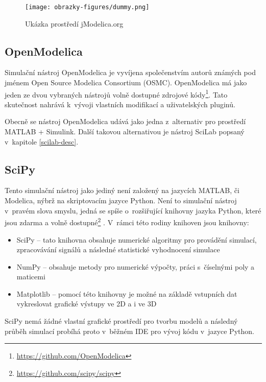 \begin{figure}
    \centering
    \texttt{[image: obrazky-figures/dummy.png]}
    \caption{Ukázka prostředí jModelica.org}
    \label{fig:jmodelica}
\end{figure}


\subsection{OpenModelica}
\label{openmodelica-desc}
Simulační nástroj OpenModelica je vyvíjena společenstvím autorů známých pod jménem Open Source Modelica Consortium (OSMC). OpenModelica má jako jeden ze dvou vybraných nástrojů volně dostupné zdrojové kódy\footnote{\url{https://github.com/OpenModelica}}. Tato skutečnost nahrává k~vývoji vlastních modifikací a uživatelských pluginů.

Obecně se nástroj OpenModelica udává jako jedna z~alternativ pro prostředí MATLAB + Simulink. Další takovou alternativou je nástroj SciLab popsaný v~kapitole \ref{scilab-desc}.


\subsection{SciPy}
\label{chapter-scipy}
Tento simulační nástroj jako jediný není založený na jazycích MATLAB, či Modelica, nýbrž na skriptovacím jazyce Python. Není to simulační nástroj v~pravém slova smyslu, jedná se spíše o~rozšiřující knihovny jazyka Python, které jsou zdarma a volně dostupné\footnote{\url{https://github.com/scipy/scipy}} \cite{scipy}. V~rámci této rodiny knihoven jsou knihovny:
\begin{itemize}
    \item SciPy -- tato knihovna obsahuje numerické algoritmy pro provádění simulací, zpracovávání signálů a následné statistické vyhodnocení simulace
    \item NumPy -- obsahuje metody pro numerické výpočty, práci s~číselnými poly a maticemi
    \item Matplotlib -- pomocí této knihovny je možné na základě vstupních dat vykreslovat grafické výstupy ve 2D a i ve 3D
\end{itemize}

SciPy nemá žádné vlastní grafické prostředí pro tvorbu modelů a následný průběh simulací probíhá proto v~běžném IDE pro vývoj kódu v~jazyce Python.

